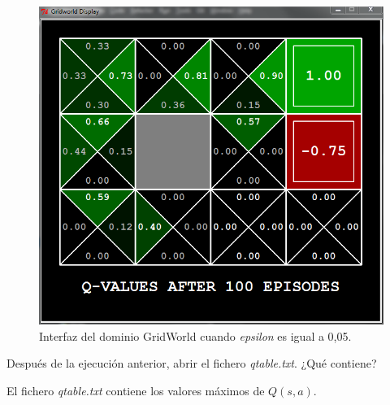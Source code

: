 \documentclass[11pt]{exam}
\begin{document}
\begin{questions}
\begin{figure}[h]
	\centering
	\includegraphics[scale=0.5]{image_4}
	\caption{Interfaz del dominio GridWorld cuando \textit{epsilon} es igual a 0,05.}
	\label{image_4}
\end{figure}

{ \question Después de la ejecución anterior, abrir el fichero \textit{qtable.txt}. ¿Qué contiene?}

El fichero \textit{qtable.txt} contiene los valores máximos de $Q(s,a)$.


\end{questions}
\end{document}
